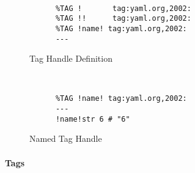 \begin{figure}[H]
  \begin{minipage}[t]{0.48\textwidth}
    \vspace{0pt}
    \begin{bchart}[max=9, width=0.85\textwidth]
    \end{bchart}
  \end{minipage}
  \begin{minipage}[t]{0pt}~\end{minipage}
  \begin{minipage}[t]{0.48\textwidth}
    \vspace{0pt}
    \begin{verbatim}
      %TAG !       tag:yaml.org,2002:
      %TAG !!      tag:yaml.org,2002:
      %TAG !name! tag:yaml.org,2002:
      ---
    \end{verbatim}
  \end{minipage}
  \caption{Tag Handle Definition}
\end{figure}

\begin{figure}[H]
  \begin{minipage}[t]{0.48\textwidth}
    \vspace{0pt}
    \begin{bchart}[max=9, width=0.85\textwidth]
    \end{bchart}
  \end{minipage}
  \begin{minipage}[t]{0pt}~\end{minipage}
  \begin{minipage}[t]{0.48\textwidth}
    \vspace{0pt}
    \begin{verbatim}
      %TAG !name! tag:yaml.org,2002:
      ---
      !name!str 6 # "6"
    \end{verbatim}
  \end{minipage}
  \caption{Named Tag Handle}
\end{figure}

\paragraph{Tags}

